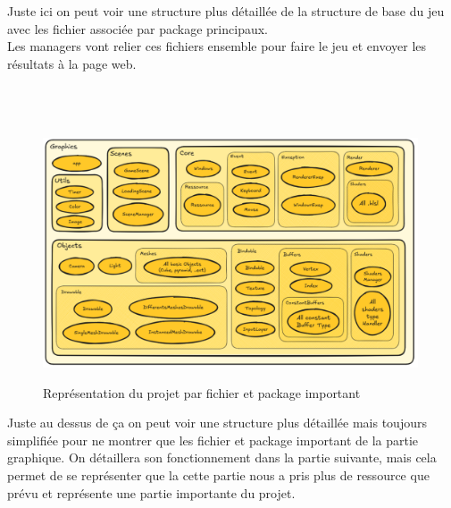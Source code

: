  \\ \\
Juste ici on peut voir une structure plus détaillée de la structure de base du jeu avec les fichier associée par package principaux. \\
Les managers vont relier ces fichiers ensemble pour faire le jeu et envoyer les résultats à la page web. \\ \\ \\ \\

\begin{figure}[h]
	\centering
	\includegraphics[width=0.99\textwidth]{images/ExcalidrawGraphics.png}
	\label{ExcalidrawGraphics}
	\caption{Représentation du projet par fichier et package important}
\end{figure}

Juste au dessus de ça on peut voir une structure plus détaillée mais toujours simplifiée pour ne montrer que les fichier et package important de la partie graphique. 
On détaillera son fonctionnement dans la partie suivante, mais cela permet de se représenter que la cette partie nous a pris plus de ressource que prévu et représente une partie importante du projet.




